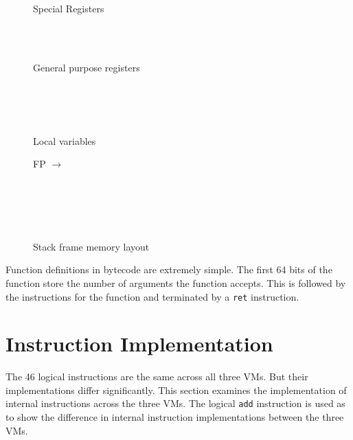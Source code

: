 \documentclass[english,a4paper,12pt]{report}
\begin{document}
\begin{figure}[!htb]
	\centering
	\begin{bytefield}[bitwidth=0.3em,endianness=big]{64}
		 \\
		\begin{rightwordgroup}{Special Registers}
			  \\
			 \\
		\end{rightwordgroup} \\
		
		\begin{rightwordgroup}{General purpose registers}
			\\
			\\
			\\
		\end{rightwordgroup} \\
		
		\begin{rightwordgroup}{Local variables}
          \begin{leftwordgroup}{FP $\rightarrow$}
          \end{leftwordgroup} \\
			 \\[1ex]
		\end{rightwordgroup} \\
	\end{bytefield}
	\caption{Stack frame memory layout}
	\label{fig:stframe}
\end{figure}

Function definitions in bytecode are extremely simple. The first 64
bits of the function store the number of arguments the function
accepts. This is followed by the instructions for the function and
terminated by a \verb|ret| instruction.

\section{Instruction Implementation}

The 46 logical instructions are the same across all three VMs. But
their implementations differ significantly. This section examines the
implementation of internal instructions across the three VMs. The
logical \verb|add| instruction is used as to show the difference in
internal instruction implementations between the three VMs.
\end{document}
